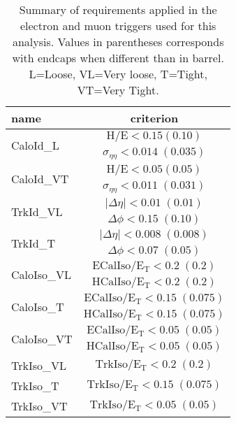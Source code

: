 \begin{table}[!ht]
 \caption{Summary of requirements applied in the electron and muon triggers used for this analysis.
Values in parentheses corresponds with endcaps when different than in barrel. L=Loose, VL=Very loose, T=Tight, VT=Very Tight.}
    \vspace{5pt}
 \label{tab:HLTElectronCuts}
 \centering
 \begin{tabular}{l|c}
   \hline
   name                       &  criterion \\
   \hline \hline
   \multirow{2}{*}{CaloId\_L} & $\mathrm{H/E < 0.15 (0.10) }$ \\
                               & $\sigma_{\eta\eta}\mathrm{< 0.014\;(0.035)}$ \\
    \hline
   \multirow{2}{*}{CaloId\_VT} & $\mathrm{H/E < 0.05 (0.05) }$ \\
                               & $\sigma_{\eta\eta}\mathrm{< 0.011\;(0.031)}$ \\
    \hline \hline
    \multirow{2}{*}{TrkId\_VL} & $|\Delta\eta|\mathrm{< 0.01\; (0.01)}$ \\
                               & $\Delta\phi\mathrm{< 0.15\;(0.10)}$  \\
    \hline
    \multirow{2}{*}{TrkId\_T} & $|\Delta\eta|\mathrm{< 0.008\; (0.008)}$ \\
                               & $\Delta\phi\mathrm{< 0.07\;(0.05)}$  \\
    \hline \hline
    \multirow{2}{*}{CaloIso\_VL} & $\mathrm{ECalIso/E_T <0.2\;(0.2)}$ \\
                                 & $\mathrm{HCalIso/E_T <0.2\;(0.2)}$ \\
    \hline
    \multirow{2}{*}{CaloIso\_T} & $\mathrm{ECalIso/E_T <0.15\;(0.075)}$ \\
                                 & $\mathrm{HCalIso/E_T <0.15\;(0.075)}$ \\
    \hline
    \multirow{2}{*}{CaloIso\_VT} & $\mathrm{ECalIso/E_T <0.05\;(0.05)}$ \\
                                 & $\mathrm{HCalIso/E_T <0.05\;(0.05)}$ \\
    \hline \hline
    TrkIso\_VL                   & $\mathrm{TrkIso/E_T <0.2\;(0.2)}$ \\
    \hline
    TrkIso\_T                   & $\mathrm{TrkIso/E_T <0.15\;(0.075)}$ \\
   \hline
    TrkIso\_VT                   & $\mathrm{TrkIso/E_T <0.05\;(0.05)}$ \\
    \hline
 \end{tabular}
\end{table}

